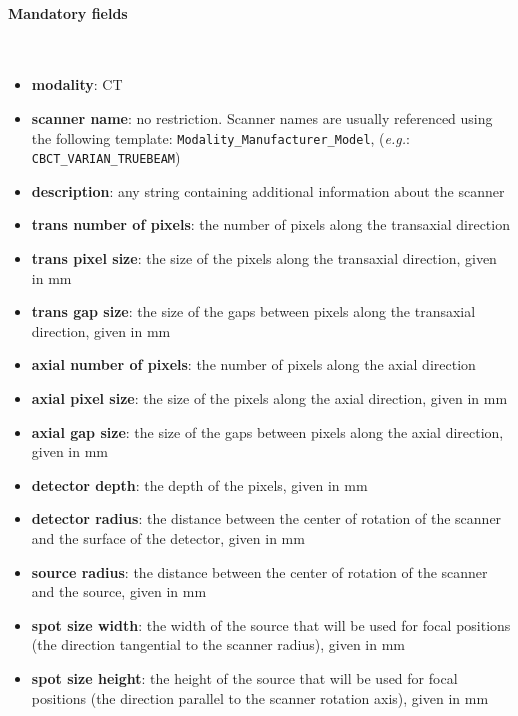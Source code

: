 \documentclass[a4paper, 11pt]{article}
\begin{document}
\paragraph{Mandatory fields}  \
\\
\begin{itemize}
  \item \textbf{modality}: CT
  \item \textbf{scanner name}: no restriction. Scanner names are usually referenced using the following template: 
        \texttt{Modality\_Manufacturer\_Model}, ({\it e.g.}: \texttt{CBCT\_VARIAN\_TRUEBEAM})
  \item \textbf{description}: any string containing additional information about the scanner
  \item \textbf{trans number of pixels}: the number of pixels along the transaxial direction
  \item \textbf{trans pixel size}: the size of the pixels along the transaxial direction, given in mm
  \item \textbf{trans gap size}: the size of the gaps between pixels along the transaxial direction, given in mm
  \item \textbf{axial number of pixels}: the number of pixels along the axial direction
  \item \textbf{axial pixel size}: the size of the pixels along the axial direction, given in mm
  \item \textbf{axial gap size}: the size of the gaps between pixels along the axial direction, given in mm
  \item \textbf{detector depth}: the depth of the pixels, given in mm
  \item \textbf{detector radius}: the distance between the center of rotation of the scanner and the surface of the detector, given in mm
  \item \textbf{source radius}: the distance between the center of rotation of the scanner and the source, given in mm
  \item \textbf{spot size width}: the width of the source that will be used for focal positions (the direction tangential to the scanner radius), given in mm
  \item \textbf{spot size height}: the height of the source that will be used for focal positions (the direction parallel to the scanner rotation axis), given in mm
\end{itemize}

\end{document}
